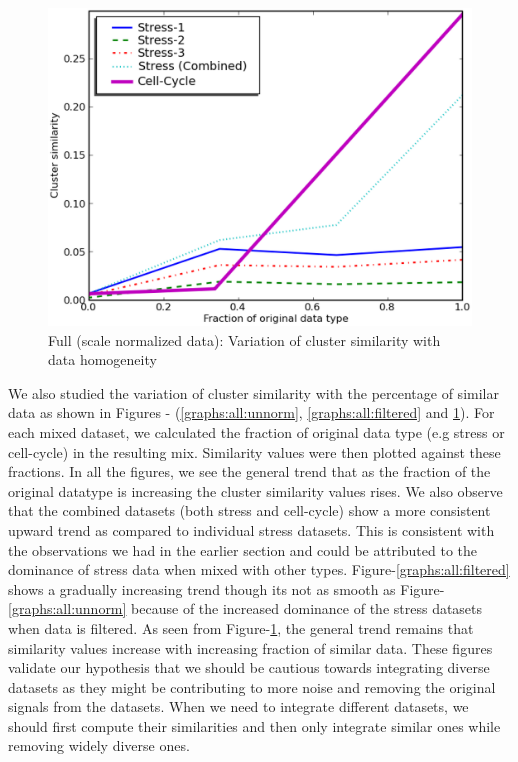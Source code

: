 \begin{figure}[p]\centering
\includegraphics[scale=0.35]{chapter1/plot_norm.eps}
\caption{Full (scale normalized data): Variation of cluster similarity with data homogeneity}
\label{graphs:all:norm}
\end{figure}

We also studied the variation of cluster similarity with the percentage of similar data as shown in Figures - (\ref{graphs:all:unnorm}, \ref{graphs:all:filtered} and \ref{graphs:all:norm}). For each mixed dataset, we calculated the fraction of original data type (e.g stress or cell-cycle) in the resulting mix. Similarity values were then plotted against these fractions. In all the figures, we see the general trend that as the fraction of the original datatype is increasing the cluster similarity values rises. We also observe that the combined datasets (both stress and cell-cycle) show a more consistent upward trend as compared to individual stress datasets. This is consistent with the observations we had in the earlier section and could be attributed to the dominance of stress data when mixed with other types. Figure-\ref{graphs:all:filtered} shows a gradually increasing trend though its not as smooth as Figure-\ref{graphs:all:unnorm} because of the increased dominance of the stress datasets when data is filtered. As seen from Figure-\ref{graphs:all:norm}, the general trend remains that similarity values increase with increasing fraction of similar data. These figures validate our hypothesis that we should be cautious towards integrating diverse datasets as they might be contributing to more noise and removing the original signals from the datasets. When we need to integrate different datasets, we should first compute their similarities and then only integrate similar ones while removing widely diverse ones.
